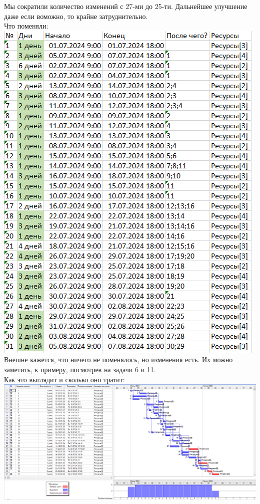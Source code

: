 \documentclass[14pt]{article}
\begin{document}
		Мы сократили количество изменений с 27-ми до 25-ти.
		Дальнейшее улучшение даже если воможно, то крайне затруднительно.\\
		{\LARGE Что поменяли:}\\
		\includegraphics[height=0.6\textheight]{../img/1a2_days_change.png}\\ 
		Внешне кажется, что ничего не поменялось, но изменения есть.
		Их можно заметить, к примеру, посмотрев на задачи 6 и 11.\\
		{\LARGE Как это выглядит и сколько оно тратит:}\\
		\includegraphics[width=\textwidth]{../img/1a2_answer.png}\\ 
\end{document}
